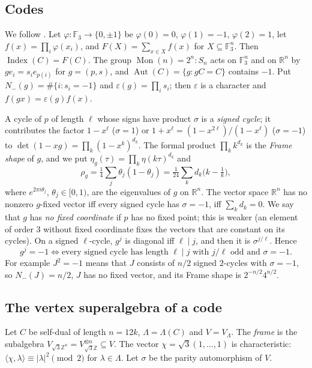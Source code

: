 \documentclass[11pt]{amsart}
\theoremstyle{definition}
\newcommand{\F}{\mathbb{F}_3}
\newcommand{\Z}{\mathbb{Z}}
\newcommand{\R}{\mathbb{R}}
\newcommand{\Index}{\operatorname{Index}}
\newcommand{\Aut}{\operatorname{Aut}}
\newcommand{\Mon}{\operatorname{Mon}}
\begin{document}
\subsection{Codes}\label{sec:codes}
We follow \cite[\S2]{I}. Let $\varphi\colon\F\to\{0,\pm1\}$ be $\varphi(0)=0$, $\varphi(1)=-1$,
$\varphi(2)=1$, let $f(x)=\prod_i\varphi(x_i)$, and $F(X)=\sum_{x\in X}f(x)$ for $X\subseteq\F^n$. Then
$\Index(C)=F(C)$. The group $\Mon(n)=2^n{:}S_n$ acts on $\F^n$ and on $\R^n$ by $ge_i=s_ie_{p(i)}$ for
$g=(p,s)$, and $\Aut(C)=\{g:gC=C\}$ contains $-1$. Put $N_-(g)=\#\{i:s_i=-1\}$ and
$\varepsilon(g)=\prod_is_i$; then $\varepsilon$ is a character and $f(gx)=\varepsilon(g)f(x)$.

A cycle of $p$ of length $\ell$ whose signs have product $\sigma$ is a \emph{signed cycle}; it
contributes the factor $1-x^\ell$ ($\sigma=1$) or $1+x^\ell=(1-x^{2\ell})/(1-x^\ell)$ ($\sigma=-1$) to
$\det(1-xg)=\prod_k(1-x^k)^{d_k}$. The formal product $\prod_kk^{d_k}$ is the \emph{Frame shape} of $g$,
and we put $\eta_g(\tau)=\prod_k\eta(k\tau)^{d_k}$ and
\[
  \rho_g=\tfrac14\sum_j\theta_j(1-\theta_j)=\tfrac1{24}\sum_kd_k\bigl(k-\tfrac1k\bigr),
\]
where $e^{2\pi i\theta_j}$, $\theta_j\in[0,1)$, are the eigenvalues of $g$ on $\R^n$. The vector space
$\R^n$ has no nonzero $g$-fixed vector iff every signed cycle has $\sigma=-1$, iff $\sum_kd_k=0$. We say
that $g$ has \emph{no fixed coordinate} if $p$ has no fixed point; this is weaker (an element of order $3$
without fixed coordinate fixes the vectors that are constant on its cycles). On a signed $\ell$-cycle,
$g^j$ is diagonal iff $\ell\mid j$, and then it is $\sigma^{j/\ell}$. Hence
\begin{equation}\label{eq:cycles}
  g^j=-1\iff\text{every signed cycle has length }\ell\mid j\text{ with }j/\ell\text{ odd and }\sigma=-1.
\end{equation}
For example $J^2=-1$ means that $J$ consists of $n/2$ signed $2$-cycles with $\sigma=-1$, so
$N_-(J)=n/2$, $J$ has no fixed vector, and its Frame shape is $2^{-n/2}4^{n/2}$.

\subsection{The vertex superalgebra of a code}
Let $C$ be self-dual of length $n=12k$, $\Lambda=\Lambda(C)$ and $V=V_\Lambda$. The \emph{frame} is the
subalgebra $V_{\sqrt3\Z^n}=V_{\sqrt3\Z}^{\otimes n}\subseteq V$. The vector $\chi=\sqrt3(1,\dots,1)$ is
characteristic: $\langle\chi,\lambda\rangle\equiv|\lambda|^2\pmod2$ for $\lambda\in\Lambda$. Let $\sigma$
be the parity automorphism of $V$.
\end{document}
